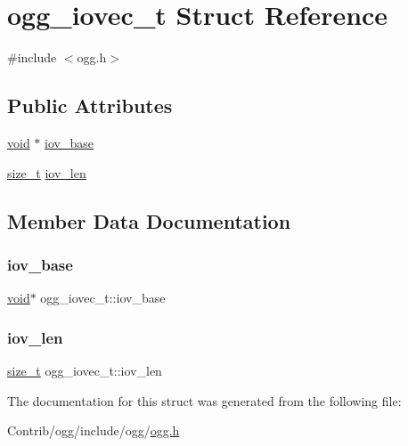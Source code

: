 \hypertarget{structogg__iovec__t}{}\section{ogg\+\_\+iovec\+\_\+t Struct Reference}
\label{structogg__iovec__t}


{\ttfamily \#include $<$ogg.\+h$>$}

\subsection*{Public Attributes}
\begin{DoxyCompactItemize}
\item 
\mbox{\hyperlink{_s_d_l__opengles2__gl2ext_8h_ae5d8fa23ad07c48bb609509eae494c95}{void}} $\ast$ \mbox{\hyperlink{structogg__iovec__t_a07c65ea68e539cc10ed1670c0de8aea0}{iov\+\_\+base}}
\item 
\mbox{\hyperlink{_s_d_l__config_8h_a7c94ea6f8948649f8d181ae55911eeaf}{size\+\_\+t}} \mbox{\hyperlink{structogg__iovec__t_a52b887e0511104920cdc181c9e4136ce}{iov\+\_\+len}}
\end{DoxyCompactItemize}


\subsection{Member Data Documentation}
\mbox{\label{structogg__iovec__t_a07c65ea68e539cc10ed1670c0de8aea0}} 
\subsubsection{\texorpdfstring{iov\+\_\+base}{iov\_base}}
{\footnotesize\ttfamily \mbox{\hyperlink{_s_d_l__opengles2__gl2ext_8h_ae5d8fa23ad07c48bb609509eae494c95}{void}}$\ast$ ogg\+\_\+iovec\+\_\+t\+::iov\+\_\+base}

\mbox{\label{structogg__iovec__t_a52b887e0511104920cdc181c9e4136ce}} 
\subsubsection{\texorpdfstring{iov\+\_\+len}{iov\_len}}
{\footnotesize\ttfamily \mbox{\hyperlink{_s_d_l__config_8h_a7c94ea6f8948649f8d181ae55911eeaf}{size\+\_\+t}} ogg\+\_\+iovec\+\_\+t\+::iov\+\_\+len}



The documentation for this struct was generated from the following file\+:\begin{DoxyCompactItemize}
\item 
Contrib/ogg/include/ogg/\mbox{\hyperlink{ogg_8h}{ogg.\+h}}\end{DoxyCompactItemize}
